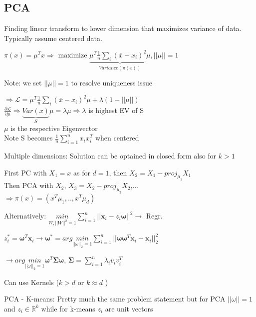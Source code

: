 \subsection{PCA}

Finding linear transform to lower dimension that maximizes variance of data. Typically assume centered data.

$\pi(x) = \mu^Tx \Rightarrow \text{ maximize } \underbrace{\mu^T\frac{1}{n}\sum_i(\bar{x} -x_i)^2\mu}_{Variance(\pi(x))}, ||\mu|| = 1$

Note: we set $||\mu|| = 1$ to resolve uniqueness issue
\begin{center}
    $\Rightarrow \mathcal{L} = \mu^T\frac{1}{n}\sum_i(\bar{x} -x_i)^2\mu + \lambda(1-||\mu||)$\\
    $\frac{\partial \mathcal{L}}{\partial \mu} \Rightarrow \underbrace{Var(x)}_{S}\mu = \lambda \mu \Rightarrow \lambda$ is highest EV of S\\
    $\mu$ is the respective Eigenvector\\
    Note S becomes $\frac{1}{n}\sum_{i=1}^nx_ix_i^T$ when centered
\end{center}
Multiple dimensions: Solution can be optained in closed form also for $k> 1$
\begin{center}
    First PC with $X_1 = x$ as for $d = 1$, then $X_2 = X_1-proj_{\mu_1}X_1$\\
    Then PCA with $X_2$, $X_3 = X_2 - proj_{\mu_2}X_2$,... \\$\Rightarrow \pi(x) = (x^T\mu_1,..,x^T\mu_d)$
\end{center}

Alternatively: $\underset{W, ||W||^2 = 1}{min}\sum_{i=1}^n||\boldsymbol{x}_i - z_i\boldsymbol{\omega}||^2 \rightarrow$ Regr.

$z_i^* = \boldsymbol{\omega}^T\boldsymbol{x}_i \rightarrow \boldsymbol{\omega}^* = arg \underset{||\omega||_2 = 1}{min}\sum_{i=1}^n||\boldsymbol{\omega}\boldsymbol{\omega}^T\boldsymbol{x}_i - \boldsymbol{x}_i||^2_2$

$\rightarrow arg \underset{||\omega||_2 = 1}{min}\boldsymbol{\omega}^T\boldsymbol{\Sigma}\boldsymbol{\omega}$, $\boldsymbol{\Sigma} = \sum_{i=1}^n \lambda_iv_iv_i^T$

Can use Kernels ($k> d$ or $k \approx d$ ) %

PCA - K-means: Pretty much the same problem statement but for PCA $||\omega|| = 1$ and $z_i \in \mathbb{R}^k$ while for k-means $z_i$ are unit vectors
